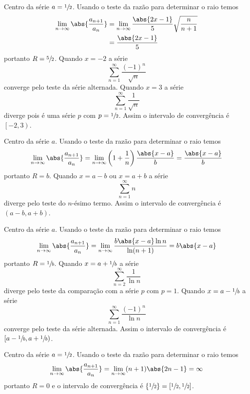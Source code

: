 \begin{exercises}
\begin{exercise}
\begin{answer}
\begin{alphalist}
  \item Centro da série $a=\sfrac{1}{2}$.
  Usando o teste da razão para determinar o raio temos
  \begin{align*}
    \lim_{n\to\infty}\abs{\frac{a_{n+1}}{a_n}}
      & = \lim_{n\to\infty} \frac{\abs{2x-1}}{5}\sqrt{\frac{n}{n+1}} \\
      & = \frac{\abs{2x-1}}{5}
  \end{align*}
  portanto $R=\sfrac{5}{2}$.
  Quando $x=-2$ a série
  \[
    \sum_{n=1}^{\infty} \frac{(-1)^n}{\sqrt{n}}
  \]
  converge pelo teste da série alternada.
  Quando $x= 3$ a série
  \[
    \sum_{n=1}^{\infty} \frac{1}{\sqrt{n}}
  \]
  diverge pois é uma série $p$ com $p=\sfrac{1}{2}$.
  Assim o intervalo de convergência é $\left[-2, 3\right)$.

  \item Centro da série $a$.
  Usando o teste da razão para determinar o raio temos
  \[
    \lim_{n\to\infty}\abs{\frac{a_{n+1}}{a_n}} =
    \lim_{n\to\infty} \left(1+\frac{1}{n}\right) \frac{\abs{x-a}}{b} =
    \frac{\abs{x-a}}{b}
  \]
  portanto $R=b$.
  Quando $x=a-b$ ou $x=a+b$ a série
  \[
    \sum_{n=1}^{\infty} n
  \]
  diverge pelo teste do $n$-ésimo termo.
  Assim o intervalo de convergência é $\left(a-b, a+b\right)$.

  \item Centro da série $a$.
  Usando o teste da razão para determinar o raio temos
  \[
    \lim_{n\to\infty} \abs{\frac{a_{n+1}}{a_n}} =
    \lim_{n\to\infty} \frac{b\abs{x-a}\ln n}{\ln(n+1)} =
    b\abs{x-a}
  \]
  portanto $R=\sfrac{1}{b}$.
  Quando $x=a+\sfrac{1}{b}$ a série
  \[
    \sum_{n=2}^{\infty}\frac{1}{\ln n}
  \]
  diverge pelo teste da comparação com a série $p$ com $p=1$.
  Quando $x=a-\sfrac{1}{b}$ a série
  \[
    \sum_{n=1}^{\infty}\frac{(-1)^n}{\ln n}
  \]
  converge pelo teste da série alternada.
  Assim o intervalo de convergência é $\left[a-\sfrac{1}{b}, a+\sfrac{1}{b}\right)$.

  \item Centro da série $a=\sfrac{1}{2}$.
  Usando o teste da razão para determinar o raio temos
  \[
    \lim_{n\to\infty}\abs{\frac{a_{n+1}}{a_n}} =
    \lim_{n\to\infty} (n+1)\abs{2n-1} = \infty
  \]
  portanto $R=0$ e o intervalo de convergência é
  $\left\{\sfrac{1}{2}\right\} = \left[\sfrac{1}{2}, \sfrac{1}{2}\right]$.


\end{alphalist}
\end{answer}
\end{exercise}
\end{exercises}

